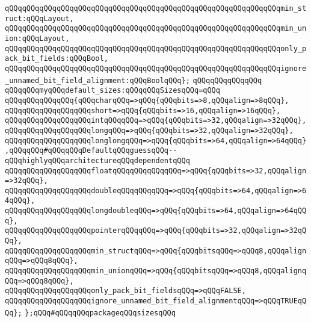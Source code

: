 \verb|qQQqqQQqqQQqqQQqqQQqqQQqqQQqqQQqqQQqqQQqqQQqqQQqqQQqqQQqqQQqqQQqmin_struct:qQQqLayout,|\newline
\verb|qQQqqQQqqQQqqQQqqQQqqQQqqQQqqQQqqQQqqQQqqQQqqQQqqQQqqQQqqQQqqQQqmin_union:qQQqLayout,|\newline
\verb|qQQqqQQqqQQqqQQqqQQqqQQqqQQqqQQqqQQqqQQqqQQqqQQqqQQqqQQqqQQqqQQqonly_pack_bit_fields:qQQqBool,|\newline
\verb|qQQqqQQqqQQqqQQqqQQqqQQqqQQqqQQqqQQqqQQqqQQqqQQqqQQqqQQqqQQqqQQqignore_unnamed_bit_field_alignment:qQQqBoolqQQq};|\newline
\verb|qQQqqQQqqQQqqQQq|\newline
\verb|qQQqqQQqmyqQQqdefault_sizes:qQQqqQQqSizesqQQq=qQQq|\newline
\verb|qQQqqQQqqQQqqQQq{qQQqcharqQQq=>qQQq{qQQqbits=>8,qQQqalign=>8qQQq},|\newline
\verb|qQQqqQQqqQQqqQQqqQQqshort=>qQQq{qQQqbits=>16,qQQqalign=>16qQQq},|\newline
\verb|qQQqqQQqqQQqqQQqqQQqintqQQqqQQq=>qQQq{qQQqbits=>32,qQQqalign=>32qQQq},|\newline
\verb|qQQqqQQqqQQqqQQqqQQqlongqQQq=>qQQq{qQQqbits=>32,qQQqalign=>32qQQq},|\newline
\verb|qQQqqQQqqQQqqQQqqQQqlonglongqQQq=>qQQq{qQQqbits=>64,qQQqalign=>64qQQq},qQQqqQQq#qQQqqQQqDefaultqQQqguessqQQq--qQQqhighlyqQQqarchitectureqQQqdependentqQQq|\newline
\verb|qQQqqQQqqQQqqQQqqQQqfloatqQQqqQQqqQQqqQQq=>qQQq{qQQqbits=>32,qQQqalign=>32qQQq},|\newline
\verb|qQQqqQQqqQQqqQQqqQQqdoubleqQQqqQQqqQQq=>qQQq{qQQqbits=>64,qQQqalign=>64qQQq},|\newline
\verb|qQQqqQQqqQQqqQQqqQQqlongdoubleqQQq=>qQQq{qQQqbits=>64,qQQqalign=>64qQQq},|\newline
\verb|qQQqqQQqqQQqqQQqqQQqpointerqQQqqQQq=>qQQq{qQQqbits=>32,qQQqalign=>32qQQq},|\newline
\verb|qQQqqQQqqQQqqQQqqQQqmin_structqQQq=>qQQq{qQQqbitsqQQq=>qQQq8,qQQqalignqQQq=>qQQq8qQQq},|\newline
\verb|qQQqqQQqqQQqqQQqqQQqmin_unionqQQq=>qQQq{qQQqbitsqQQq=>qQQq8,qQQqalignqQQq=>qQQq8qQQq},|\newline
\verb|qQQqqQQqqQQqqQQqqQQqonly_pack_bit_fieldsqQQq=>qQQqFALSE,|\newline
\verb|qQQqqQQqqQQqqQQqqQQqignore_unnamed_bit_field_alignmentqQQq=>qQQqTRUEqQQq};|\newline
\newline
\verb|};qQQq#qQQqqQQqpackageqQQqsizesqQQq|\newline

